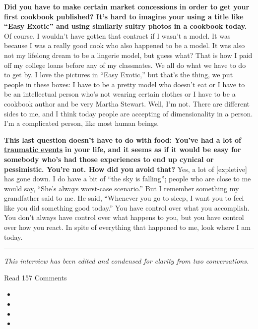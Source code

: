 \textbf{Did you have to make certain market concessions in order to get
your first cookbook published? It's hard to imagine your using a title
like ``Easy Exotic'' and using similarly sultry photos in a cookbook
today.} Of course. I wouldn't have gotten that contract if I wasn't a
model. It was because I was a really good cook who also happened to be a
model. It was also not my lifelong dream to be a lingerie model, but
guess what? That is how I paid off my college loans before any of my
classmates. We all do what we have to do to get by. I love the pictures
in ``Easy Exotic,'' but that's the thing, we put people in these boxes:
I have to be a pretty model who doesn't eat or I have to be an
intellectual person who's not wearing certain clothes or I have to be a
cookbook author and be very Martha Stewart. Well, I'm not. There are
different sides to me, and I think today people are accepting of
dimensionality in a person. I'm a complicated person, like most human
beings.

\textbf{This last question doesn't have to do with food: You've had a
lot of} \textbf{\href{http://nytimes.com\#tooltip-12}{traumatic events}}
\textbf{in your life, and it seems as if it would be easy for somebody
who's had those experiences to end up cynical or pessimistic. You're
not. How did you avoid that?} Yes, a lot of {[}expletive{]} has gone
down. I do have a bit of ``the sky is falling''; people who are close to
me would say, ``She's always worst-case scenario.'' But I remember
something my grandfather said to me. He said, ``Whenever you go to
sleep, I want you to feel like you did something good today.'' You have
control over what you accomplish. You don't always have control over
what happens to you, but you have control over how you react. In spite
of everything that happened to me, look where I am today.

\begin{center}\rule{0.5\linewidth}{\linethickness}\end{center}

\emph{This interview has been edited and condensed for clarity from two
conversations.}

Read 157 Comments

\begin{itemize}
\item
\item
\item
\item
\end{itemize}

